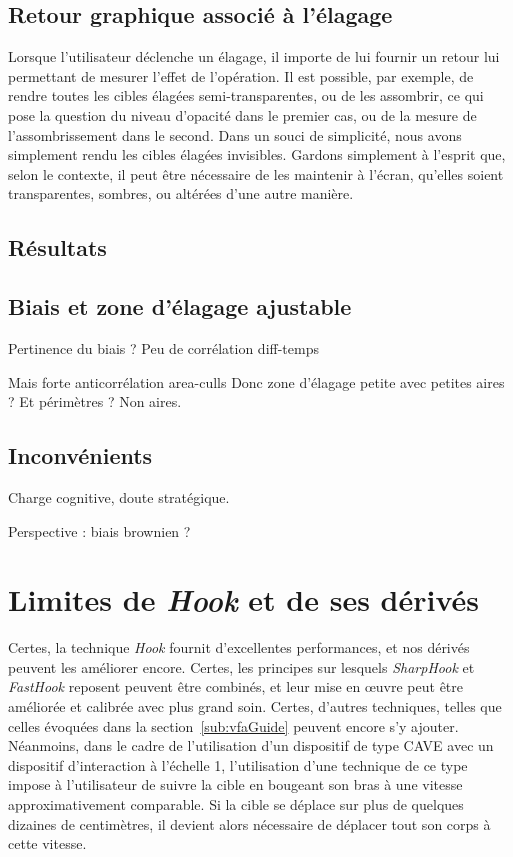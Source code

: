 	
	\subsection{Retour graphique associé à l'élagage}
	Lorsque l'utilisateur déclenche un élagage, il importe de lui fournir un retour lui permettant de mesurer l'effet de l'opération. Il est possible, par exemple, de rendre toutes les cibles élagées semi-transparentes, ou de les assombrir, ce qui pose la question du niveau d'opacité dans le premier cas, ou de la mesure de l'assombrissement dans le second. Dans un souci de simplicité, nous avons simplement rendu les cibles élagées invisibles. Gardons simplement à l'esprit que, selon le contexte, il peut être nécessaire de les maintenir à l'écran, qu'elles soient transparentes, sombres, ou altérées d'une autre manière.
	
	\subsection{Résultats}
	
	\subsection{Biais et zone d'élagage ajustable}
	Pertinence du biais ? Peu de corrélation diff-temps
	
	Mais forte anticorrélation area-culls
		Donc zone d'élagage petite avec petites aires ?
		Et périmètres ?
		Non aires.
	
	\subsection{Inconvénients}
	Charge cognitive, doute stratégique.
	
	Perspective : biais brownien ?
	
	\section{Limites de \emph{Hook} et de ses dérivés}
	Certes, la technique \emph{Hook} fournit d'excellentes performances, et nos dérivés peuvent les améliorer encore. Certes, les principes sur lesquels \emph{SharpHook} et \emph{FastHook} reposent peuvent être combinés, et leur mise en œuvre peut être améliorée et calibrée avec plus grand soin. Certes, d'autres techniques, telles que celles évoquées dans la section~\ref{sub:vfaGuide} peuvent encore s'y ajouter. Néanmoins, dans le cadre de l'utilisation d'un dispositif de type CAVE avec un dispositif d'interaction à l'échelle 1, l'utilisation d'une technique de ce type impose à l'utilisateur de suivre la cible en bougeant son bras à une vitesse approximativement comparable. Si la cible se déplace sur plus de quelques dizaines de centimètres, il devient alors nécessaire de déplacer tout son corps à cette vitesse.
	
